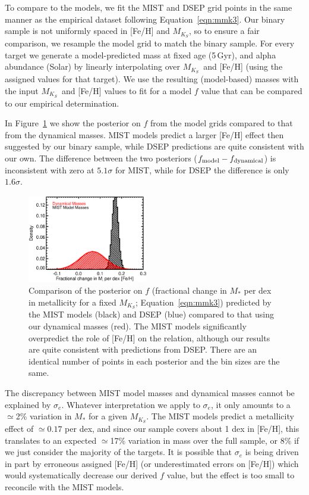 \documentclass[twocolumn]{aastex62}
\newcommand{\mks}{$M_{K_S}$}
\begin{document}
To compare to the models, we fit the MIST and DSEP grid points in the same manner as the empirical dataset following Equation~\ref{eqn:mmk3}. Our binary sample is not uniformly spaced in [Fe/H] and \mks, so to ensure a fair comparison, we resample the model grid to match the binary sample. For every target we generate a model-predicted mass at fixed age (5\,Gyr), and alpha abundance (Solar) by linearly interpolating over \mks\ and [Fe/H] (using the assigned values for that target). We use the resulting (model-based) masses with the input \mks\ and [Fe/H] values to fit for a model $f$ value that can be compared to our empirical determination.

In Figure~\ref{fig:f} we show the posterior on $f$ from the model grids compared to that from the dynamical masses. MIST models predict a larger [Fe/H] effect then suggested by our binary sample, while DSEP predictions are quite consistent with our own. The difference between the two posteriors ($f_{\rm{model}}-f_{\rm{dynamical}}$) is inconsistent with zero at $5.1\sigma$ for MIST, while for DSEP the difference is only $1.6\sigma$. 

\begin{figure}[htp]
\begin{center}
\includegraphics[width=0.47\textwidth]{F_plot.eps}
\caption{Comparison of the posterior on $f$ (fractional change in $M_*$ per dex in metallicity for a fixed \mks; Equation~\ref{eqn:mmk3}) predicted by the MIST models (black) and DSEP (blue) compared to that using our dynamical masses (red). The MIST models significantly overpredict the role of [Fe/H] on the relation, although our results are quite consistent with predictions from DSEP. There are an identical number of points in each posterior and the bin sizes are the same. }
\label{fig:f}
\end{center}
\end{figure}

The discrepancy between MIST model masses and dynamical masses cannot be explained by $\sigma_e$. Whatever interpretation we apply to $\sigma_e$, it only amounts to a $\simeq$2\% variation in $M_*$ for a given \mks. The MIST models predict a metallicity effect of $\simeq0.17$ per dex, and since our sample covers about 1 dex in [Fe/H], this translates to an expected $\simeq$17\% variation in mass over the full sample, or 8\% if we just consider the majority of the targets. It is possible that $\sigma_e$ is being driven in part by erroneous assigned [Fe/H] (or underestimated errors on [Fe/H]) which would systematically decrease our derived $f$ value, but the effect is too small to reconcile with the MIST models. 
\end{document}
